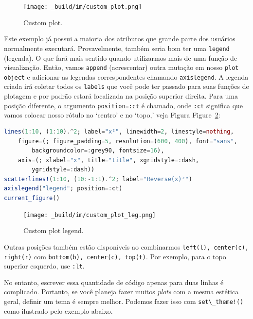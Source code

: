 \documentclass[
  notoc %
]{tufte-book}
\newcommand{\passthrough}[1]{#1}
\begin{document}
\begin{figure}
\hypertarget{fig:custom_plot}{%
\centering
\texttt{[image: \_build/im/custom\_plot.png]}
\caption{Custom plot.}\label{fig:custom_plot}
}
\end{figure}

Este exemplo já possui a maioria dos atributos que grande parte dos
usuários normalmente executará. Provavelmente, também seria bom ter uma
\passthrough{\lstinline!legend!} (legenda). O que fará mais sentido
quando utilizarmos mais de uma função de visualização. Então, vamos
\passthrough{\lstinline!append!} (acrescentar) outra mutação em nosso
\passthrough{\lstinline!plot object!} e adicionar as legendas
correspondentes chamando \passthrough{\lstinline!axislegend!}. A legenda
criada irá coletar todos os \passthrough{\lstinline!labels!} que você
pode ter passado para suas funções de plotagem e por padrão estará
localizada na posição superior direita. Para uma posição diferente, o
argumento \passthrough{\lstinline!position=:ct!} é chamado, onde
\passthrough{\lstinline!:ct!} significa que vamos colocar nosso rótulo
no `centro' e no `topo,' veja Figura Figure~\ref{fig:custom_plot_leg}:

\begin{lstlisting}[language=Julia]
lines(1:10, (1:10).^2; label="x²", linewidth=2, linestyle=nothing,
    figure=(; figure_padding=5, resolution=(600, 400), font="sans",
        backgroundcolor=:grey90, fontsize=16),
    axis=(; xlabel="x", title="title", xgridstyle=:dash,
        ygridstyle=:dash))
scatterlines!(1:10, (10:-1:1).^2; label="Reverse(x)²")
axislegend("legend"; position=:ct)
current_figure()
\end{lstlisting}

\begin{figure}
\hypertarget{fig:custom_plot_leg}{%
\centering
\texttt{[image: \_build/im/custom\_plot\_leg.png]}
\caption{Custom plot legend.}\label{fig:custom_plot_leg}
}
\end{figure}

Outras posições também estão disponíveis ao combinarmos
\passthrough{\lstinline!left(l), center(c), right(r)!} com
\passthrough{\lstinline!bottom(b), center(c), top(t)!}. Por exemplo,
para o topo superior esquerdo, use \passthrough{\lstinline!:lt!}.

No entanto, escrever essa quantidade de código apenas para duas linhas é
complicado. Portanto, se você planeja fazer muitos \emph{plots} com a
mesma estética geral, definir um tema é sempre melhor. Podemos fazer
isso com \passthrough{\lstinline"set\_theme!()"} como ilustrado pelo
exemplo abaixo.
\end{document}
